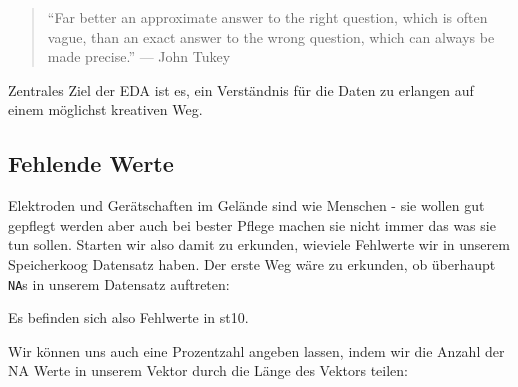 \documentclass[
]{article}
\newenvironment{Shaded}{\begin{snugshade}}{\end{snugshade}}
\newcommand{\AttributeTok}[1]{\textcolor[rgb]{0.77,0.63,0.00}{#1}}
\newcommand{\CommentTok}[1]{\textcolor[rgb]{0.56,0.35,0.01}{\textit{#1}}}
\newcommand{\DecValTok}[1]{\textcolor[rgb]{0.00,0.00,0.81}{#1}}
\newcommand{\DocumentationTok}[1]{\textcolor[rgb]{0.56,0.35,0.01}{\textbf{\textit{#1}}}}
\newcommand{\FunctionTok}[1]{\textcolor[rgb]{0.00,0.00,0.00}{#1}}
\newcommand{\NormalTok}[1]{#1}
\newcommand{\SpecialCharTok}[1]{\textcolor[rgb]{0.00,0.00,0.00}{#1}}
\begin{document}
\begin{quote}
``Far better an approximate answer to the right question, which is often vague, than an exact answer to the wrong question, which can always be made precise.'' --- John Tukey
\end{quote}

Zentrales Ziel der EDA ist es, ein Verständnis für die Daten zu erlangen auf einem möglichst kreativen Weg.

\hypertarget{fehlende-werte-1}{%
\subsection{Fehlende Werte}\label{fehlende-werte-1}}

Elektroden und Gerätschaften im Gelände sind wie Menschen - sie wollen gut gepflegt werden aber auch bei bester Pflege machen sie nicht immer das was sie tun sollen. Starten wir also damit zu erkunden, wieviele Fehlwerte wir in unserem Speicherkoog Datensatz haben. Der erste Weg wäre zu erkunden, ob überhaupt \texttt{NA}s in unserem Datensatz auftreten:

\begin{Shaded}
\end{Shaded}

Es befinden sich also Fehlwerte in st10.

\begin{Shaded}
\end{Shaded}

Wir können uns auch eine Prozentzahl angeben lassen, indem wir die Anzahl der NA Werte in unserem Vektor durch die Länge des Vektors teilen:

\begin{Shaded}
\end{Shaded}
\end{document}
